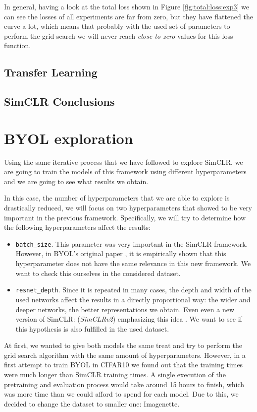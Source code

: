 In general, having a look at the total loss shown in Figure \ref{fig:total:loss:exp3} we can see the losses of all experiments are far from zero, but they have flattened the curve a lot, which means that probably with the used set of parameters to perform the grid search we will never reach \emph{close to zero} values for this loss function.

\subsection{Transfer Learning}


\subsection{SimCLR Conclusions}

\section{BYOL exploration}

Using the same iterative process that we have followed to explore SimCLR, we are going to train the models of this framework using different hyperparameters and we are going to see what results we obtain.

In this case, the number of hyperparameters that we are able to explore is drastically reduced, we will focus on two hyperparameters that showed to be very important in the previous framework. Specifically, we will try to determine how the following hyperparameters affect the results:

\begin{itemize}
\item \lstinline{batch_size}. This parameter was very important in the SimCLR framework. However, in BYOL's original paper \citep{grill2020bootstrap}, it is empirically shown that this hyperparameter does not have the same relevance in this new framework. We want to check this ourselves in the considered dataset.
\item \lstinline{resnet_depth}. Since it is repeated in many cases, the depth and width of the used networks affect the results in a directly proportional way: the wider and deeper networks, the better representations we obtain. Even even a new version of SimCLR: (\emph{SimCLRv2}) emphasizing this idea \citep{chen2020big}. We want to see if this hypothesis is also fulfilled in the used dataset.
\end{itemize}

At first, we wanted to give both models the same treat and try to perform the grid search algorithm with the same amount of hyperparameters. However, in a first attempt to train BYOL in CIFAR10 we found out that the training times were much longer than SimCLR training times. A single execution of the pretraining and evaluation process would take around 15 hours to finish, which was more time than we could afford to spend for each model. Due to this, we decided to change the dataset to smaller one: Imagenette. 


